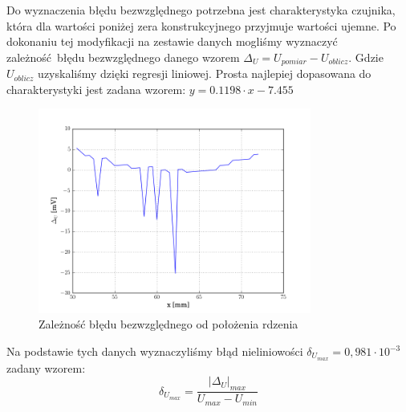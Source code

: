 \documentclass[a4paper, 12pt, titlepage]{article}
\begin{document}
				Do wyznaczenia błędu bezwzględnego potrzebna jest charakterystyka czujnika, która dla wartości poniżej zera konstrukcyjnego przyjmuje wartości ujemne. Po dokonaniu tej modyfikacji na zestawie danych mogliśmy wyznaczyć zależność błędu bezwzględnego danego wzorem $\Delta_U = U_{pomiar} - U_{oblicz}$. Gdzie $U_{oblicz}$ uzyskaliśmy dzięki regresji liniowej. Prosta najlepiej dopasowana do charakterystyki jest zadana wzorem: $y = 0.1198 \cdot x -7.455$
				\begin{figure}[H]
					\centering
					\includegraphics[width=0.8\textwidth]{./img/Uac_blad.png}
					\caption{\small{Zależność błędu bezwzględnego od położenia rdzenia}}
				\end{figure} \noindent
				Na podstawie tych danych wyznaczyliśmy błąd nieliniowości $\delta_{U_{max}} = 0,981\cdot10^{-3}$ zadany wzorem:
				\begin{equation}
					\delta_{U_{max}} = \frac{|\Delta_U|_{max}}{U_{max}-U_{min}}
				\end{equation}
\end{document}

